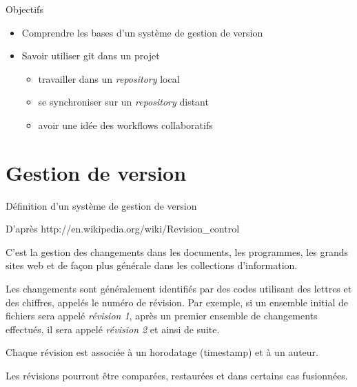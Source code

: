 \begin{frame}{%
\protect\hypertarget{objectifs}{%
Objectifs}}

\begin{itemize}
\tightlist
\item
  Comprendre les bases d’un système de gestion de version
\item
  Savoir utiliser git dans un projet

  \begin{itemize}
  \tightlist
  \item
    travailler dans un \emph{repository} local
  \item
    se synchroniser sur un \emph{repository} distant
  \item
    avoir une idée des workflows collaboratifs
  \end{itemize}
\end{itemize}

\end{frame}

\hypertarget{gestion-de-version}{%
\section{Gestion de version}\label{gestion-de-version}}

\begin{frame}{%
\protect\hypertarget{duxe9finition-dun-systuxe8me-de-gestion-de-version}{%
Définition d’un système de gestion de version}}

D’après http://en.wikipedia.org/wiki/Revision\_control

C’est la gestion des changements dans les documents, les programmes, les
grands sites web et de façon plus générale dans les collections
d’information.

Les changements sont généralement identifiés par des codes utilisant des
lettres et des chiffres, appelés le \alert{numéro de révision}. Par
exemple, si un ensemble initial de fichiers sera appelé \emph{révision
1}, après un premier ensemble de changements effectués, il sera appelé
\emph{révision 2} et ainsi de suite.

\alert{Chaque révision} est associée à un horodatage (\alert{timestamp}) et à un \alert{auteur}.

Les révisions pourront être comparées, restaurées et dans certains cas
fusionnées.

\end{frame}

